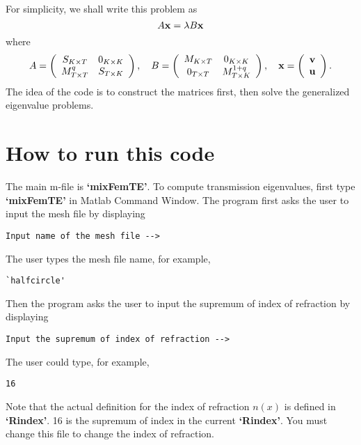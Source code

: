 \documentclass[12pt]{article}%
\numberwithin{equation}{section}
\numberwithin{remark}{section}
\numberwithin{example}{section}
\begin{document}
For simplicity, we shall write this problem as
\begin{equation}\label{GEPab}
A {\bf x} = \lambda B{\bf x}
\end{equation}
where
\[
A = \left(\begin{array}{cc}
S_{K \times T}&0_{K \times K}\\
M_{T \times T}^q & S_{T \times K} \end{array}\right), \quad B= \left(\begin{array}{cc}
M_{K \times T}&0_{K \times K}\\
0_{T \times T} & M_{T \times K}^{1+q} \end{array}\right)
, \quad {\bf x} =\left(\begin{array}{c}
{\bf v} \\
{\bf u}  \end{array}\right).
\]
The idea of the code is to construct the matrices first, then solve the generalized eigenvalue problems.
\section{How to run this code}
The main m-file is \textbf{`mixFemTE'}. To compute transmission eigenvalues, first type \textbf{`mixFemTE'} in Matlab Command Window.
The program first asks the user to input the mesh file by displaying
\begin{verbatim}
Input name of the mesh file -->
\end{verbatim}
The user types the mesh file name, for example,
\begin{verbatim}
`halfcircle'
\end{verbatim}
Then the program asks the user to input the supremum of index of refraction by displaying
\begin{verbatim}
Input the supremum of index of refraction -->
\end{verbatim}
The user could type, for example,
\begin{verbatim}
16
\end{verbatim}
Note that the actual definition for the index of refraction $n(x)$ is defined in \textbf{`Rindex'}.
16 is the supremum of index
in the current \textbf{`Rindex'}. You must change this file to change the index of refraction.
\end{document}
